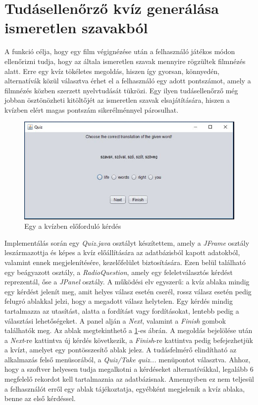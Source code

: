 \section{Tudásellenőrző kvíz generálása ismeretlen szavakból}

A funkció célja, hogy egy film végignézése után a felhasználó játékos módon ellenőrizni tudja, hogy az általa ismeretlen szavak mennyire rögzültek filmnézés alatt.
Erre egy kvíz tökéletes megoldás, hiszen így gyorsan, könnyedén, alternatívák közül választva érhet el a felhasználó egy adott pontszámot, amely a filmnézés közben szerzett nyelvtudását tükrözi. Egy ilyen tudásellenőrző még jobban ösztönözheti kitöltőjét az ismeretlen szavak elsajátítására, hiszen a kvízben elért magas pontszám sikerélménnyel párosulhat.

\begin{figure}[h!]
  \includegraphics[width=\linewidth]{images/quiz.jpg}
  \caption{Egy a kvízben előforduló kérdés}
  \label{fig:quiz}
\end{figure}

Implementálás során egy \textit{Quiz.java} osztályt készítettem, amely a \textit{JFrame} osztály leszármazottja és képes a kvíz előállítására az adatbázisból kapott adatokból, valamint ennek megjelenítésére, kezelőfelület biztosítására. Ezen belül található egy beágyazott osztály, a \textit{RadioQuestion}, amely egy feleletválasztós kérdést reprezentál, őse a \textit{JPanel} osztály. A működési elv egyszerű: a kvíz ablaka mindig egy kérdést jelenít meg, amit helyes válasz esetén cserél, rossz válasz esetén pedig felugró ablakkal jelzi, hogy a megadott válasz helytelen. Egy kérdés mindig tartalmazza az utasítást, alatta a fordítást vagy fordításokat, lentebb pedig a választási lehetőségeket. A panel alján a \textit{Next}, valamint a \textit{Finish} gombok találhatók meg. Az ablak megtekinthető a \ref{fig:quiz}-es ábrán. A megoldás bejelölése után a \textit{Next}-re kattintva új kérdés következik, a \textit{Finish}-re kattintva pedig befejezhetjük a kvízt, amelyet egy pontösszesítő ablak jelez. A tudásfelmérő elindítható az alkalmazás felső menüsorából, a \textit{Quiz/Take quiz...} menüpontot választva. Ahhoz, hogy a szoftver helyesen tudja megalkotni a kérdéseket alternatívákkal, legalább 6 megfelelő rekordot kell tartalmaznia az adatbázisnak. Amennyiben ez nem teljesül a felhasználót erről egy ablak tájékoztatja, egyébként megjelenik a kvíz ablaka, benne az első kérdéssel.

